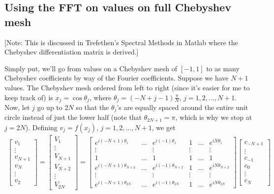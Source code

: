\subsection{Using the FFT on values on full Chebyshev mesh}

[Note: This is discussed in Trefethen's Spectral Methods in Matlab
where the Chebyshev differentiation matrix is derived.]

Simply put, we'll go from values on a Chebyshev mesh of $[-1,1]$
to as many Chebyshev coefficients by way of the Fourier coefficients. 
Suppose we have $N+1$ values. 
The Chebyshev mesh ordered from left to right (since it's easier
for me to keep track of) is $x_j = \cos\theta_j$,
where $\theta_j = (-N+j-1)\frac{\pi}{N}$, $j = 1,2,...,N+1$.
Now, let $j$ go up to $2N$ so that the $\theta_j$'s are equally
spaced around the entire unit circle instead of just the lower half
(note that $\theta_{2N+1} = \pi$, which is why we stop at
$j = 2N$). Defining $v_j = f(x_j)$, $j = 1,2,...,N+1$, we get
\begin{align*}
 \begin{bmatrix}
  v_1      \\ \vdots \\ v_{N+1} \\ v_N     \\ \vdots \\ v_2
 \end{bmatrix}
 = 
 \begin{bmatrix}
  V_1      \\ \vdots \\ V_{N+1} \\ V_{N+2} \\ \vdots \\ V_{2N}
 \end{bmatrix}
 = 
 \begin{bmatrix}
  e^{i(-N+1)\theta_1}     & \hdots & e^{i(-1)\theta_1}     & 1      & \hdots & e^{iN\theta_1} \\ 
  \vdots                  &        & \vdots                & \vdots &        & \vdots \\ 
  1                       & \hdots & 1                     & 1      & \hdots & 1 \\ 
  e^{i(-N+1)\theta_{N+2}} & \hdots & e^{i(-1)\theta_{N+2}} & 1      & \hdots & e^{iN\theta_{N+2}} \\ 
  \vdots                  &        & \vdots                & \vdots &        & \vdots \\ 
  e^{i(-N+1)\theta_{2N}}  & \hdots & e^{i(-1)\theta_{2N}}  & 1      & \hdots & e^{iN\theta_{2N}}
 \end{bmatrix}
 \begin{bmatrix}
  c_{-N+1} \\ \vdots \\ c_{-1}  \\ c_0     \\ \vdots \\ c_N
 \end{bmatrix}
\end{align*}
